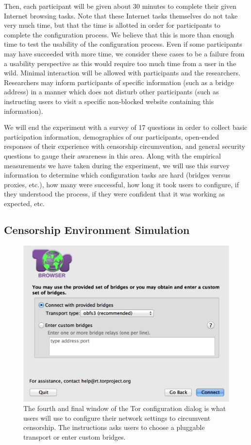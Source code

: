 \documentclass[letterpaper,twocolumn,11pt]{article}
\begin{document}
Then, each participant will be given about 30 minutes to complete their given Internet browsing tasks. 
Note that these Internet tasks themselves do not take very much time, but that the time is allotted in order
for participants to complete the configuration process. We believe that this is more than enough time to 
test the usability of the configuration process. Even if some participants may have succeeded with more 
time, we consider these cases to be a failure from a usability perspective as this would require too much
time from a user in the wild. Minimal interaction will be allowed with participants and the researchers. 
Researchers may inform participants of specific information (such as a bridge address) in a manner 
which does not disturb other participants (such as instructing users to visit a specific non-blocked website 
containing this information). 

We will end the experiment with a survey of 17 questions in order to collect basic participation information, 
demographics of our participants, open-ended responses of their experience with censorship circumvention,
and general security questions to gauge their awareness in this area. Along with the empirical measurements 
we have taken during the experiment, we will use this survey information to determine which configuration tasks are hard (bridges versus proxies, etc.), how many were successful, how long it took users to configure, if they understood the process, if they were confident that it was working as expected, etc.  

\subsection{Censorship Environment Simulation}

\begin{figure}[t]
\includegraphics[width=\linewidth]{configuration-dialog.png}
\caption{The fourth and final window of the Tor configuration dialog is what users will use to 
configure their network settings to circumvent censorship. The instructions asks users to 
choose a pluggable transport or enter custom bridges.}
\label{dialog}
\end{figure}
\end{document}
